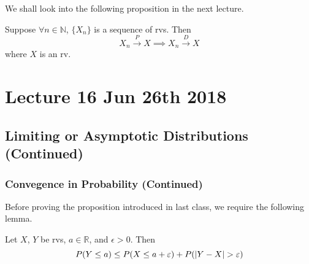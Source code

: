 \documentclass[notoc,notitlepage]{tufte-book}
\newcommand{\convd}{\overset{D}{\to}}
\newcommand{\convp}{\overset{P}{\to}}
\begin{document}
We shall look into the following proposition in the next lecture.

\begin{propononum}
  Suppose $\forall n \in \mathbb{N}$, $\{ X_n \}$ is a sequence of rvs. Then
  \begin{equation*}
    X_n \convp X \implies X_n \convd X
  \end{equation*}
  where $X$ is an rv.
\end{propononum}




\chapter{Lecture 16 Jun 26th 2018}%
\label{chp:lecture_16_jun_26th_2018}

\section{Limiting or Asymptotic Distributions (Continued)}%
\label{sec:limiting_or_asymptotic_distributions_continued}

\subsection{Convegence in Probability (Continued)}%
\label{sub:convegence_in_probability_continued}

Before proving the proposition introduced in last class, we require the following lemma.

\begin{lemma}
\label{lemma:cdf_bounded_abv}
  Let $X$, $Y$ be rvs, $a \in \mathbb{R}$, and $\epsilon > 0$. Then
  \begin{equation*}
    P( Y \leq a ) \leq P( X \leq a + \varepsilon ) + P ( \left|Y - X\right| > \varepsilon )
  \end{equation*}
\end{lemma}
\end{document}
